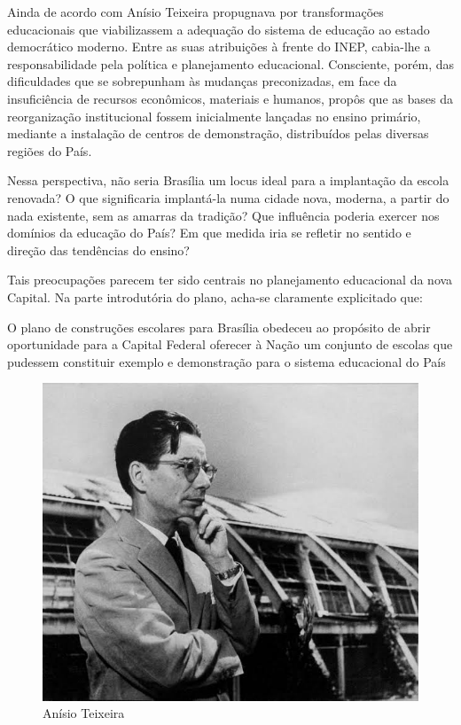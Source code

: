 Ainda de acordo com  Anísio Teixeira propugnava por transformações educacionais que viabilizassem
a adequação do sistema de educação ao estado democrático moderno. Entre as suas
atribuições à frente do INEP, cabia-lhe a responsabilidade pela política e planejamento
educacional. Consciente, porém, das dificuldades que se sobrepunham às mudanças
preconizadas, em face da insuficiência de recursos econômicos, materiais e humanos,
propôs que as bases da reorganização institucional fossem inicialmente lançadas no
ensino primário, mediante a instalação de centros de demonstração, distribuídos pelas
diversas regiões do País.

Nessa perspectiva, não seria Brasília um locus ideal para a implantação da escola
renovada? O que significaria implantá-la numa cidade nova, moderna, a partir do nada
existente, sem as amarras da tradição? Que influência poderia exercer nos domínios da educação do País? Em que medida iria se refletir no sentido e direção das tendências do
ensino?

    Tais preocupações parecem ter sido centrais no planejamento educacional da
nova Capital. Na parte introdutória do plano, acha-se claramente explicitado que:

\begin{citacao}
    O plano de construções escolares para Brasília obedeceu ao propósito de
    abrir oportunidade para a Capital Federal oferecer à Nação um conjunto de
    escolas que pudessem constituir exemplo e demonstração para o sistema
    educacional do País
\end{citacao}

\begin{figure}[h!]
    \centering
    \includegraphics[width=0.7\linewidth]{fig/Anisio-Teixeira}
    \caption{Anísio Teixeira}
    \label{fig:anisio-teixeira}
\end{figure}



